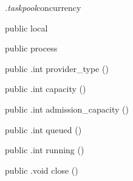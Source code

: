 \begin{CrexxClass}{\textit{.taskpool}}{concurrency}

  \begin{Hierarchy}
  \end{Hierarchy}

  \begin{Members}

    \Factory
      {public}
      {local}
      {}

    \Factory
      {public}
      {process}
      {}

    \Method
      {public}
      {.int}
      {provider\_type}
      {()}

    \Method
      {public}
      {.int}
      {capacity}
      {()}

    \Method
      {public}
      {.int}
      {admission\_capacity}
      {()}

    \Method
      {public}
      {.int}
      {queued}
      {()}

    \Method
      {public}
      {.int}
      {running}
      {()}

    \Method
      {public}
      {.void}
      {close}
      {()}

  \end{Members}
\end{CrexxClass}

